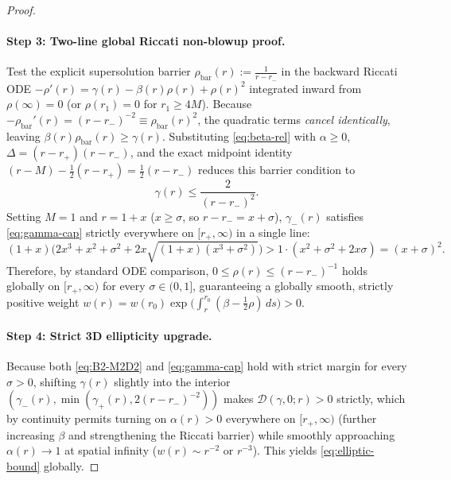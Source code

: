 \documentclass[11pt, a4paper]{article}
\theoremstyle{remark}
\begin{document}
\begin{proof}
\paragraph{Step 3: Two-line global Riccati non-blowup proof.}
Test the explicit supersolution barrier $\rho_{\mathrm{bar}}(r) := \frac{1}{r - r_-}$ in the backward Riccati ODE $-\rho'(r) = \gamma(r) - \beta(r)\rho(r) + \rho(r)^2$ integrated inward from $\rho(\infty) = 0$ (or $\rho(r_1) = 0$ for $r_1 \ge 4M$). Because $-\rho_{\mathrm{bar}}'(r) = (r - r_-)^{-2} \equiv \rho_{\mathrm{bar}}(r)^2$, the quadratic terms \emph{cancel identically}, leaving $\beta(r)\rho_{\mathrm{bar}}(r) \ge \gamma(r)$. Substituting \eqref{eq:beta-rel} with $\alpha \ge 0$, $\Delta = (r - r_+)(r - r_-)$, and the exact midpoint identity $(r - M) - \frac{1}{2}(r - r_+) = \frac{1}{2}(r - r_-)$ reduces this barrier condition to
\begin{equation}
\label{eq:gamma-cap}
\gamma(r) \le \frac{2}{(r - r_-)^2}.
\end{equation}
Setting $M = 1$ and $r = 1 + x$ ($x \ge \sigma$, so $r - r_- = x + \sigma$), $\gamma_-(r)$ satisfies \eqref{eq:gamma-cap} strictly everywhere on $[r_+, \infty)$ in a single line:
\begin{equation}
(1 + x)\Big(2x^3 + x^2 + \sigma^2 + 2x\sqrt{(1 + x)(x^3 + \sigma^2)}\Big) > 1\cdot(x^2 + \sigma^2 + 2x\sigma) = (x + \sigma)^2.
\end{equation}
Therefore, by standard ODE comparison, $0 \le \rho(r) \le (r - r_-)^{-1}$ holds globally on $[r_+, \infty)$ for every $\sigma \in (0, 1]$, guaranteeing a globally smooth, strictly positive weight $w(r) = w(r_0)\exp\!\big(\int_r^{r_0}(\beta - \frac{1}{2}\rho)\,ds\big) > 0$.

\paragraph{Step 4: Strict 3D ellipticity upgrade.}
Because both \eqref{eq:B2-M2D2} and \eqref{eq:gamma-cap} hold with strict margin for every $\sigma > 0$, shifting $\gamma(r)$ slightly into the interior $(\gamma_-(r), \min(\gamma_+(r), 2(r - r_-)^{-2}))$ makes $\mathcal{D}(\gamma, 0; r) > 0$ strictly, which by continuity permits turning on $\alpha(r) > 0$ everywhere on $[r_+, \infty)$ (further increasing $\beta$ and strengthening the Riccati barrier) while smoothly approaching $\alpha(r) \to 1$ at spatial infinity ($w(r) \sim r^{-2}$ or $r^{-3}$). This yields \eqref{eq:elliptic-bound} globally.
\end{proof}
\end{document}
